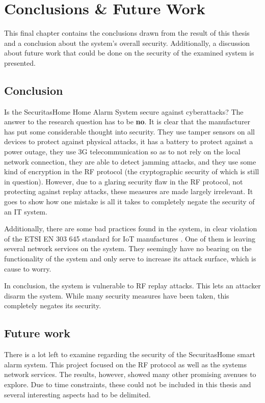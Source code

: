 \chapter{Conclusions \& Future Work} \label{ch:conclusion}
This final chapter contains the conclusions drawn from the result of this thesis and a conclusion about the system's overall security. Additionally, a discussion about future work that could be done on the security of the examined system is presented.

\section{Conclusion}
Is the SecuritasHome Home Alarm System secure against cyberattacks? The answer to the research question has to be \textbf{no}. It is clear that the manufacturer has put some considerable thought into security. They use tamper sensors on all devices to protect against physical attacks, it has a battery to protect against a power outage, they use 3G telecommunication so as to not rely on the local network connection, they are able to detect jamming attacks, and they use some kind of encryption in the RF protocol (the cryptographic security of which is still in question). However, due to a glaring security flaw in the RF protocol, not protecting against replay attacks, these measures are made largely irrelevant. It goes to show how one mistake is all it takes to completely negate the security of an IT system.

Additionally, there are some bad practices found in the system, in clear violation of the ETSI EN 303 645 standard for IoT manufactures \cite{etsi-iot-standard}. One of them is leaving several network services on the system. They seemingly have no bearing on the functionality of the system and only serve to increase its attack surface, which is cause to worry.

In conclusion, the system is vulnerable to RF replay attacks. This lets an attacker disarm the system. While many security measures have been taken, this completely negates its security.

\section{Future work} \label{ch:conclusion:related-work}
There is a lot left to examine regarding the security of the SecuritasHome smart alarm system. This project focused on the RF protocol as well as the systems network services. The results, however, showed many other promising avenues to explore. Due to time constraints, these could not be included in this thesis and several interesting aspects had to be delimited.

